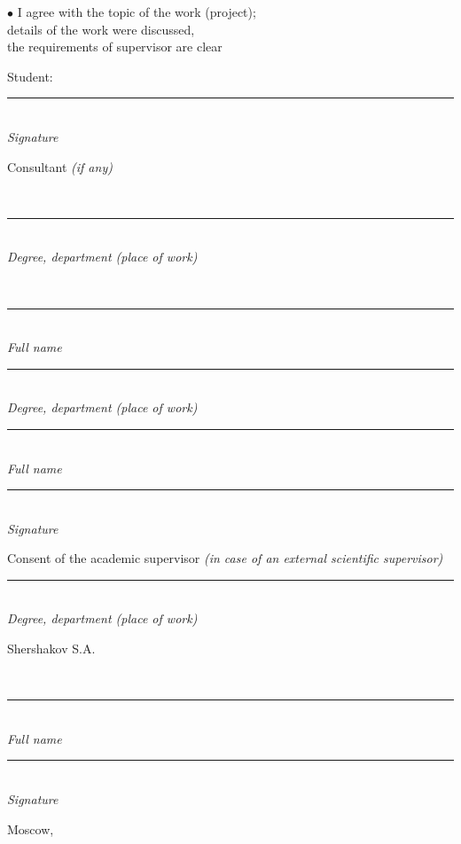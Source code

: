 \documentclass[12pt,a4paper]{article}
\newcommand{\hseSignField}[2]{%
  \begin{minipage}[t]{#1}\centering
    \rule{\linewidth}{0.4pt}\\[-2pt]{\footnotesize\itshape #2}
  \end{minipage}}
\newcommand{\hseFilledField}[3]{%
  \begin{minipage}[t]{#1}\centering
    {\small\strut #2}\\[-4pt]\rule{\linewidth}{0.4pt}\\[-2pt]{\footnotesize\itshape #3}
  \end{minipage}}
\begin{document}
\begin{otherlanguage}{english}
\vspace{0.5cm}
\begin{minipage}[t]{0.55\textwidth}
$\bullet$ I agree with the topic of the work (project);\\
details of the work were discussed,\\
the requirements of supervisor are clear
\end{minipage}\hfill
\begin{minipage}[t]{0.4\textwidth}
\vspace{0.5cm}
Student: \hfill \hseSignField{0.5\textwidth}{Signature}
\end{minipage}

\vspace{0.5cm}
\begin{minipage}[t]{0.27\textwidth}\raggedright Consultant {\itshape(if any)}\end{minipage}%
\ifhseHasCoSupervisor
\hseFilledField{0.3\textwidth}{\foreignlanguage{russian}{\hseCoSupervisorTitle\ifdefempty{\hseCoSupervisorDegree}{}{, \hseCoSupervisorDegree}}}{Degree, department (place of work)}\hfill
\hseFilledField{0.22\textwidth}{\foreignlanguage{russian}{\hseCoSupervisorShortName}}{Full name}\hfill
\else
\hseSignField{0.3\textwidth}{Degree, department (place of work)}\hfill
\hseSignField{0.22\textwidth}{Full name}\hfill
\fi
\hseSignField{0.15\textwidth}{Signature}

\vspace{0.5cm}
\begin{minipage}[t]{0.27\textwidth}\raggedright Consent of the academic supervisor {\itshape(in case of an external scientific supervisor)}\end{minipage}%
\hseSignField{0.3\textwidth}{Degree, department (place of work)}\hfill
\hseFilledField{0.22\textwidth}{Shershakov S.A.}{Full name}\hfill
\hseSignField{0.15\textwidth}{Signature}

\vfill
\begin{center}Moscow, \the\year\end{center}
\end{otherlanguage}
\end{document}
